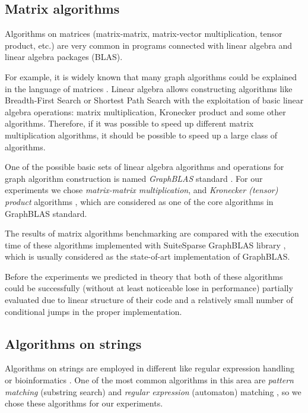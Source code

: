 \documentclass[conference]{IEEEtran}
\begin{document}
\subsection{Matrix algorithms}

Algorithms on matrices (matrix-matrix, matrix-vector multiplication, tensor product, etc.) are very common in programs connected with linear algebra and linear algebra packages (BLAS).

For example, it is widely known that many graph algorithms could be explained in the language of matrices \cite{kepner2011graph,davis2019algorithm}. Linear algebra allows constructing algorithms like Breadth-First Search or Shortest Path Search with the exploitation of basic linear algebra operations: matrix multiplication, Kronecker product and some other algorithms. Therefore, if it was possible to speed up different matrix multiplication algorithms, it should be possible to speed up a large class of algorithms. 

One of the possible basic sets of linear algebra algorithms and operations for graph algorithm construction is named \textit{GraphBLAS} standard \cite{davis2019algorithm,moreira2018implementing}. For our experiments we chose \textit{matrix-matrix multiplication}, and \textit{Kronecker (tensor) product} algorithms \cite{cormen2009introduction}, which are considered as one of the core algorithms in GraphBLAS standard.

The results of matrix algorithms benchmarking are compared with the execution time of these algorithms implemented with SuiteSparse GraphBLAS library \cite{moreira2018implementing}, which is usually considered as the state-of-art implementation of GraphBLAS.

Before the experiments we predicted in theory that both of these algorithms could be successfully (without at least noticeable lose in performance) partially evaluated due to linear structure of their code and a relatively small number of conditional jumps in the proper implementation.


\subsection{Algorithms on strings}

Algorithms on strings are employed in different like regular expression handling or bioinformatics \cite{rajesh2010unusual}. One of the most common algorithms in this area are \textit{pattern matching} (substring search) and \textit{regular expression} (automaton) matching \cite{cormen2009introduction}, so we chose these algorithms for our experiments.
\end{document}
